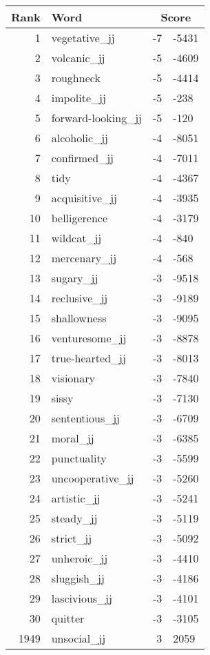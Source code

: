 \begin{longtable}[!htbp]{| rlr@{.}l |}
    \hline
    \textbf{Rank} & \textbf{Word} & \multicolumn{2}{c|}{\textbf{Score}} \\
    \hline
    \endhead
    1 & vegetative\_jj & -7 & -5431 \\
    2 & volcanic\_jj & -5 & -4609 \\
    3 & roughneck & -5 & -4414 \\
    4 & impolite\_jj & -5 & -238 \\
    5 & forward-looking\_jj & -5 & -120 \\
    6 & alcoholic\_jj & -4 & -8051 \\
    7 & confirmed\_jj & -4 & -7011 \\
    8 & tidy & -4 & -4367 \\
    9 & acquisitive\_jj & -4 & -3935 \\
    10 & belligerence & -4 & -3179 \\
    11 & wildcat\_jj & -4 & -840 \\
    12 & mercenary\_jj & -4 & -568 \\
    13 & sugary\_jj & -3 & -9518 \\
    14 & reclusive\_jj & -3 & -9189 \\
    15 & shallowness & -3 & -9095 \\
    16 & venturesome\_jj & -3 & -8878 \\
    17 & true-hearted\_jj & -3 & -8013 \\
    18 & visionary & -3 & -7840 \\
    19 & sissy & -3 & -7130 \\
    20 & sententious\_jj & -3 & -6709 \\
    21 & moral\_jj & -3 & -6385 \\
    22 & punctuality & -3 & -5599 \\
    23 & uncooperative\_jj & -3 & -5260 \\
    24 & artistic\_jj & -3 & -5241 \\
    25 & steady\_jj & -3 & -5119 \\
    26 & strict\_jj & -3 & -5092 \\
    27 & unheroic\_jj & -3 & -4410 \\
    28 & sluggish\_jj & -3 & -4186 \\
    29 & lascivious\_jj & -3 & -4101 \\
    30 & quitter & -3 & -3105 \\
    1949 & unsocial\_jj & 3 & 2059 \\

\end{longtable}

